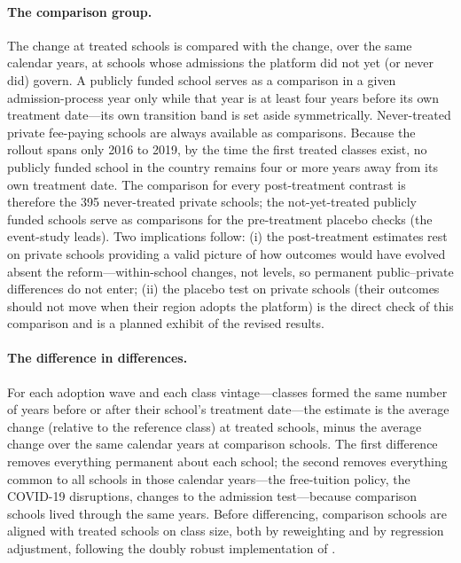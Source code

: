 \paragraph{The comparison group.}
The change at treated schools is compared with the change, over the same calendar years, at schools whose admissions the platform did not yet (or never did) govern. A publicly funded school serves as a comparison in a given admission-process year only while that year is at least four years before its own treatment date---its own transition band is set aside symmetrically. Never-treated private fee-paying schools are always available as comparisons. Because the rollout spans only 2016 to 2019, by the time the first treated classes exist, no publicly funded school in the country remains four or more years away from its own treatment date. The comparison for every post-treatment contrast is therefore the 395 never-treated private schools; the not-yet-treated publicly funded schools serve as comparisons for the pre-treatment placebo checks (the event-study leads). Two implications follow: (i) the post-treatment estimates rest on private schools providing a valid picture of how outcomes would have evolved absent the reform---within-school changes, not levels, so permanent public--private differences do not enter; (ii) the placebo test on private schools (their outcomes should not move when their region adopts the platform) is the direct check of this comparison and is a planned exhibit of the revised results.

\paragraph{The difference in differences.}
For each adoption wave and each class vintage---classes formed the same number of years before or after their school's treatment date---the estimate is the average change (relative to the reference class) at treated schools, minus the average change over the same calendar years at comparison schools. The first difference removes everything permanent about each school; the second removes everything common to all schools in those calendar years---the free-tuition policy, the COVID-19 disruptions, changes to the admission test---because comparison schools lived through the same years. Before differencing, comparison schools are aligned with treated schools on class size, both by reweighting and by regression adjustment, following the doubly robust implementation of \citet{callaway2021}.

